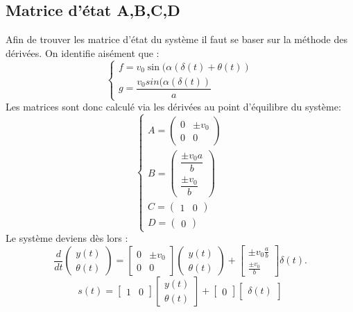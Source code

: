 \documentclass[11pt,a4paper]{article}
\begin{document}
\subsection{Matrice d'état A,B,C,D}
Afin de trouver les matrice d'état du système il faut se baser sur la méthode des dérivées.
On identifie aisément que :
\begin{equation}
	\begin{cases}
		f= v_0 \sin(\alpha(\delta(t)+\theta(t)) \\
		g= \dfrac{v_0 sin(\alpha(\delta(t))}{a}
	\end{cases}
\end{equation}
Les matrices sont donc calculé via les dérivées au point d'équilibre du système:
\begin{equation}
	\begin{cases}
		A= \begin{pmatrix}
			   0 & \pm v_0 \\
			   0 & 0
		   \end{pmatrix}       \\
		B= \begin{pmatrix}
			   \dfrac{\pm v_0 a}{b} \\
			   \dfrac{\pm v_0}{b}
		   \end{pmatrix} \\
		C= \begin{pmatrix}
			   1 & 0
		   \end{pmatrix}       \\
		D= \begin{pmatrix}
			   0
		   \end{pmatrix}
	\end{cases}
\end{equation}
Le système deviens dès lors :
$$
	\frac{d}{dt}
	\begin{pmatrix}
		y(t) \\
		\theta(t)
	\end{pmatrix}
	=
	\begin{bmatrix}
		0 & \pm v_0 \\
		0 & 0
	\end{bmatrix}
	\begin{pmatrix}
		y(t) \\
		\theta(t)
	\end{pmatrix}
	+
	\begin{bmatrix}
		\pm v_0 \frac{a}{b} \\
		\frac{\pm v_0}{b}
	\end{bmatrix}
	\delta(t).
$$
$$s(t)=\begin{bmatrix} 1 & 0 \end{bmatrix}
  \begin{bmatrix}y(t) \\ \theta(t) \end{bmatrix}
    + \begin{bmatrix}0 \end{bmatrix} \begin{bmatrix} \delta(t) \end{bmatrix}
$$
\end{document}
